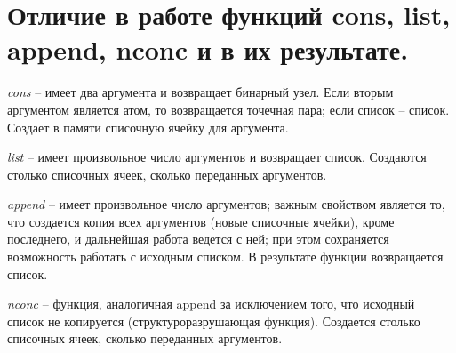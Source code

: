 \section{Отличие в работе функций cons, list, append, nconc и в их результате.}
\textit{cons} -- имеет два аргумента и возвращает бинарный узел. Если вторым аргументом является атом, то возвращается точечная пара; если список -- список. Создает в памяти списочную ячейку для аргумента.

\textit{list} -- имеет произвольное число аргументов и возвращает список. Создаются столько списочных ячеек, сколько переданных аргументов.

\textit{append} -- имеет произвольное число аргументов; важным свойством является то, что создается копия всех аргументов (новые списочные ячейки), кроме последнего, и дальнейшая работа ведется с ней; при этом сохраняется возможность работать с исходным списком. В результате функции возвращается список. 

\textit{nconc} -- функция, аналогичная append за исключением того, что исходный список не копируется (структуроразрушающая функция). Создается столько списочных ячеек, сколько переданных аргументов.